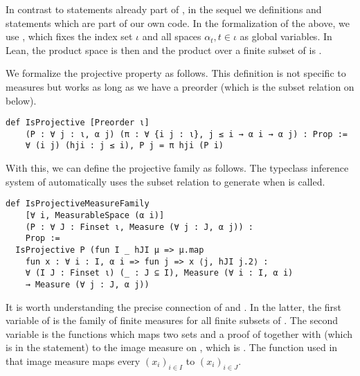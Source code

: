 \documentclass[lean]{DraftAFM}
\begin{document}
In contrast to statements already part of , in the
sequel we  definitions and statements which
are part of our own code. In the formalization of the above, we use
, which fixes the
index set $\iota$ and all spaces $\alpha_t, t\in\iota$ as global
variables.  In Lean, the product space is then 
and the product over a finite subset  of  is .

We formalize the projective property as follows. This definition is not specific to measures but works as long as we have a preorder
(which is the subset relation on  below).

\begin{verbatim}
def IsProjective [Preorder ι]
    (P : ∀ j : ι, α j) (π : ∀ {i j : ι}, j ≤ i → α i → α j) : Prop :=
    ∀ (i j) (hji : j ≤ i), P j = π hji (P i)
\end{verbatim}

\noindent
With this, we can define the projective family as follows. The typeclass inference system of
 automatically uses the subset relation to generate
 when  is
called.

\begin{verbatim}
def IsProjectiveMeasureFamily
    [∀ i, MeasurableSpace (α i)]
    (P : ∀ J : Finset ι, Measure (∀ j : J, α j)) :
    Prop :=
  IsProjective P (fun I _ hJI μ => μ.map
    fun x : ∀ i : I, α i => fun j => x ⟨j, hJI j.2⟩ :
    ∀ (I J : Finset ι) (_ : J ⊆ I), Measure (∀ i : I, α i)
    → Measure (∀ j : J, α j))
\end{verbatim}

\noindent
It is worth understanding the precise connection of
 and
. In the latter, the first
variable of  is the family  of
finite measures for all finite subsets of . The second
variable is the functions which maps two sets  and a proof  of  together with
 (which is  in the statement) to the image
measure on , which is .  The function used in that image
measure maps every $(x_i)_{i\in I}$ to $(x_i)_{i\in J}$.
\end{document}
